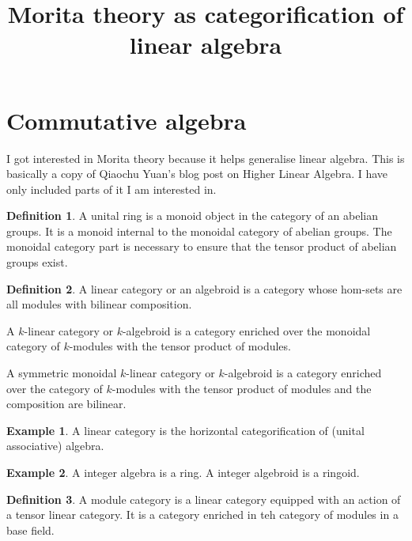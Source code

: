 \documentclass[10pt]{article}
\theoremstyle{plain}%
\theoremstyle{definition}
\newtheorem{definition}{Definition}[section]
\newtheorem{example}{Example}[section]
\theoremstyle{remark}
\begin{document}
\title{Morita theory as categorification of linear algebra}

\maketitle

\section{Commutative algebra}

I got interested in Morita theory because it helps generalise linear algebra. This is basically a copy of Qiaochu Yuan's blog post on Higher Linear Algebra. I have only included parts of it I am interested in.

\begin{definition}
	A unital ring is a monoid object in the category of an abelian groups. It is a monoid internal to the monoidal category of abelian groups. The monoidal category part is necessary to ensure that the tensor product of abelian groups exist.
\end{definition}

\begin{definition}
	A linear category or an algebroid is a category whose hom-sets are all modules with bilinear composition.

	A $k$-linear category or $k$-algebroid is a category enriched over the monoidal category of $k$-modules with the tensor product of modules.

	A symmetric monoidal $k$-linear category or $k$-algebroid is a category enriched over the category of $k$-modules with the tensor product of modules and the composition are bilinear. 
\end{definition}

\begin{example}
	A linear category is the horizontal categorification of (unital associative) algebra.
\end{example}

\begin{example}
	A integer algebra is a ring. A integer algebroid is a ringoid.
\end{example}

\begin{definition}
	A module category is a linear category equipped with an action of a tensor linear category. It is a category enriched in teh category of modules in a base field.
\end{definition}
\end{document}
